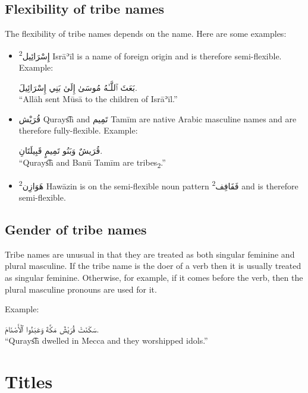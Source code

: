 \documentclass[
  10pt,
]{book}
\begin{document}
\subsection{Flexibility of tribe names}\label{flexibility-of-tribe-names}

The flexibility of tribe names depends on the name. Here are some examples:

\begin{itemize}
\item
  \textsuperscript{2}\foreignlanguage{arabic}{إِسْرَائِيل} Isrāʾīl is a name of foreign origin and is therefore semi-flexible. Example:

  \foreignlanguage{arabic}{بَعَثَ ٱللَّـٰهُ مُوسَىٰ إِلَىٰ بَنِي إِسْرَائِيلَ.}\\
  \enquote{Allāh sent Mūsā to the children of Isrāʾīl.}
\item
  \foreignlanguage{arabic}{قُرَيْش} Qurays͡h and \foreignlanguage{arabic}{تَمِيم} Tamīm are native Arabic masculine names and are therefore fully-flexible. Example:

  \foreignlanguage{arabic}{قُرَيشٌ وَبَنُو تَمِيمٍ قَبِيلَتَانِ.}\\
  \enquote{Qurays͡h and Banū Tamīm are tribes\textsubscript{2}.}
\item
  \textsuperscript{2}\foreignlanguage{arabic}{هَوَازِن} Hawāzin is on the semi-flexible noun pattern \textsuperscript{2}\foreignlanguage{arabic}{فَفَافِف} and is therefore semi-flexible.
\end{itemize}

\subsection{Gender of tribe names}\label{gender-of-tribe-names}

Tribe names are unusual in that they are treated as both singular feminine and plural masculine.
If the tribe name is the doer of a verb then it is usually treated as singular feminine.
Otherwise, for example, if it comes before the verb, then the plural masculine pronouns are used for it.

Example:

\foreignlanguage{arabic}{سَکَنَتْ قُرَيْشٌ مَکَّةَ وَعَبَدُوا ٱلْأَصْنَامَ.}\\
\enquote{Qurays͡h dwelled in Mecca and they worshipped idols.}

\section{Titles}\label{titles}
\end{document}
